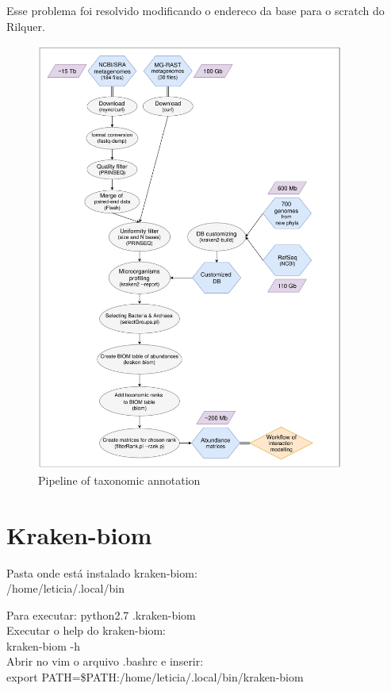 \documentclass[12pt, a4paper]{report}
\begin{document}
Esse problema foi resolvido modificando o endereco da base para o scratch do Rilquer.

\begin{figure}
  \centering 
  \includegraphics[width=0.9\textwidth]{figures/workflow-aquifers-reviewed_03-09-18.pdf}
  \caption{Pipeline of taxonomic annotation} 
  \end{figure}

\section{Kraken-biom}
Pasta onde está instalado kraken-biom: \\
/home/leticia/.local/bin

Para executar:
python2.7 .\/kraken-biom \\

Executar o help do kraken-biom: \\
kraken-biom -h \\

Abrir no vim o arquivo .bashrc e inserir: \\
export PATH=\$PATH:/home/leticia/.local/bin/kraken-biom \\
\end{document}
